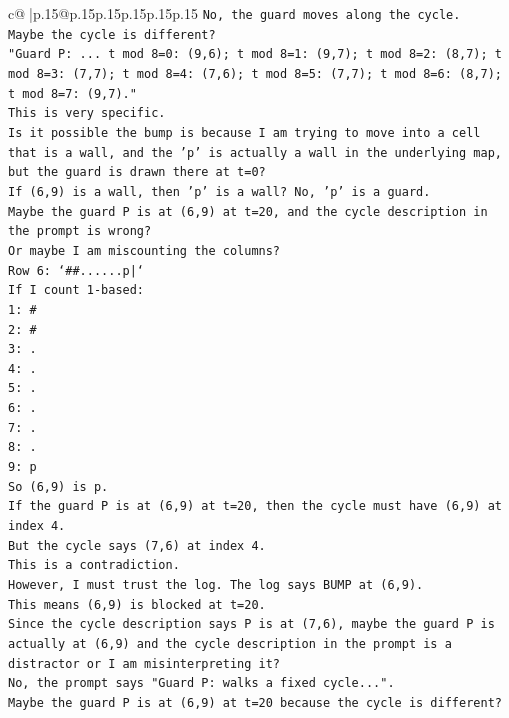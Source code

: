 \documentclass{article}
\begin{document}
{\begin{supertabular}{c@{$\;$}|p{.15\linewidth}@{}p{.15\linewidth}p{.15\linewidth}p{.15\linewidth}p{.15\linewidth}p{.15\linewidth}}
{{{\texttt{No, the guard moves along the cycle.} \\
\texttt{Maybe the cycle is different?} \\
\texttt{"Guard P: ... t mod 8=0: (9,6); t mod 8=1: (9,7); t mod 8=2: (8,7); t mod 8=3: (7,7); t mod 8=4: (7,6); t mod 8=5: (7,7); t mod 8=6: (8,7); t mod 8=7: (9,7)."} \\
\texttt{This is very specific.} \\
\texttt{Is it possible the bump is because I am trying to move into a cell that is a wall, and the 'p' is actually a wall in the underlying map, but the guard is drawn there at t=0?} \\
\texttt{If (6,9) is a wall, then 'p' is a wall? No, 'p' is a guard.} \\
\texttt{Maybe the guard P is at (6,9) at t=20, and the cycle description in the prompt is wrong?} \\
\texttt{Or maybe I am miscounting the columns?} \\
\texttt{Row 6: `\#\#......p|`} \\
\texttt{If I count 1{-}based:} \\
\texttt{1: \#} \\
\texttt{2: \#} \\
\texttt{3: .} \\
\texttt{4: .} \\
\texttt{5: .} \\
\texttt{6: .} \\
\texttt{7: .} \\
\texttt{8: .} \\
\texttt{9: p} \\
\texttt{So (6,9) is p.} \\
\texttt{If the guard P is at (6,9) at t=20, then the cycle must have (6,9) at index 4.} \\
\texttt{But the cycle says (7,6) at index 4.} \\
\texttt{This is a contradiction.} \\
\texttt{However, I must trust the log. The log says BUMP at (6,9).} \\
\texttt{This means (6,9) is blocked at t=20.} \\
\texttt{Since the cycle description says P is at (7,6), maybe the guard P is actually at (6,9) and the cycle description in the prompt is a distractor or I am misinterpreting it?} \\
\texttt{No, the prompt says "Guard P: walks a fixed cycle...".} \\
\texttt{Maybe the guard P is at (6,9) at t=20 because the cycle is different?} \\
}}}
\end{supertabular}}
\end{document}
